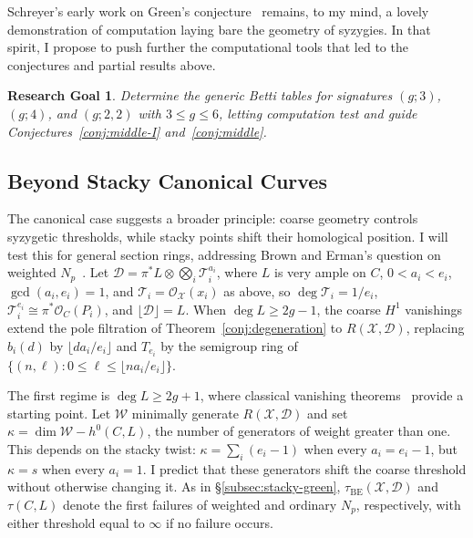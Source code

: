\documentclass[11pt,reqno]{amsart}
\newtheorem{goal}[lemma]{Research Goal}
\theoremstyle{remark}
\newcommand{\BE}{\operatorname{BE}}
\newcommand{\cD}{\mathcal{D}}
\newcommand{\cO}{\mathcal{O}}
\newcommand{\cT}{\mathcal{T}}
\newcommand{\cW}{\mathcal{W}}
\newcommand{\cX}{\mathcal{X}}
\begin{document}
Schreyer's early work on Green's conjecture~\cite{schreyer91} remains, to my mind, a lovely demonstration of computation laying bare the geometry of syzygies. In that spirit, I propose to push further the computational tools that led to the conjectures and partial results above.
\begin{goal}
Determine the generic Betti tables for signatures $(g;3)$, $(g;4)$, and $(g;2,2)$ with $3\leq g\leq 6$, letting computation test and guide Conjectures~\ref{conj:middle-I} and~\ref{conj:middle}.
\end{goal}

\subsection{Beyond Stacky Canonical Curves}\label{subsec:stacks-further}

The canonical case suggests a broader principle: coarse geometry controls syzygetic thresholds, while stacky points shift their homological position. I will test this for general section rings, addressing Brown and Erman's question on weighted $N_p$~\cite[Ques.~7.6]{brownErman25}. Let $\cD=\pi^*L\otimes\bigotimes_i\cT_i^{a_i}$, where $L$ is very ample on $C$, $0<a_i<e_i$, $\gcd(a_i,e_i)=1$, and $\cT_i=\cO_{\cX}(x_i)$ as above, so $\deg\cT_i=1/e_i$, $\cT_i^{e_i}\cong\pi^*\cO_C(P_i)$, and $\lfloor\cD\rfloor=L$. When $\deg L\geq2g-1$, the coarse $H^1$ vanishings extend the pole filtration of Theorem~\ref{conj:degeneration} to $R(\cX,\cD)$, replacing $b_i(d)$ by $\lfloor da_i/e_i\rfloor$ and $T_{e_i}$ by the semigroup ring of $\{(n,\ell):0\leq\ell\leq\lfloor na_i/e_i\rfloor\}$.

The first regime is $\deg L\geq2g+1$, where classical vanishing theorems~\cite{green84-I,greenLazarsfeld88} provide a starting point. Let $\cW$ minimally generate $R(\cX,\cD)$ and set $\kappa=\dim\cW-h^0(C,L)$, the number of generators of weight greater than one. This depends on the stacky twist: $\kappa=\sum_i(e_i-1)$ when every $a_i=e_i-1$, but $\kappa=s$ when every $a_i=1$. I predict that these generators shift the coarse threshold without otherwise changing it. As in \S\ref{subsec:stacky-green}, $\tau_{\BE}(\cX,\cD)$ and $\tau(C,L)$ denote the first failures of weighted and ordinary $N_p$, respectively, with either threshold equal to $\infty$ if no failure occurs.
\end{document}
